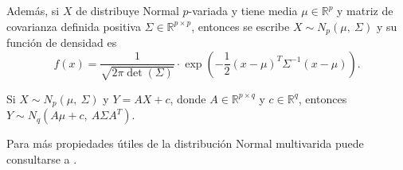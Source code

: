 Además, si $X$ de distribuye Normal $p$-variada y tiene media 
$\mu\in \mathbb R^p$ y matriz de covarianza definida positiva
$\Sigma \in \mathbb R^{p\times p}$, entonces se escribe
$X\sim N_p(\mu,\ \Sigma)$ y su función de densidad es 
\begin{equation*}
    f(x) = \frac{1}{\sqrt{2\pi\det(\Sigma)}}\cdot 
    \exp\left(
        -\frac{1}{2}(x-\mu)^T \Sigma^{-1} (x-\mu)
    \right).
\end{equation*}

\begin{theorem}
Si $X\sim N_p(\mu,\ \Sigma)$ y $Y=AX+c$, donde 
$A\in \mathbb R^{p\times q}$ y $c\in \mathbb R^q$, 
entonces $Y\sim N_q(A\mu + c,\ A\Sigma A^T)$.
\end{theorem}

Para más propiedades útiles de la distribución Normal multivarida puede 
consultarse a \cite{mardiaMultivariateAnalysis1979}.